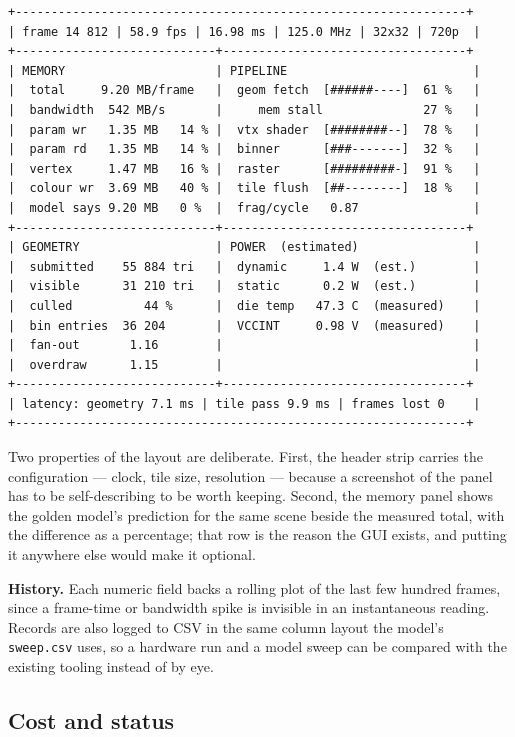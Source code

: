 \documentclass[11pt,a4paper]{article}
\newcommand{\field}[1]{\textbf{#1}\quad}
\begin{document}
\begin{verbatim}
+---------------------------------------------------------------+
| frame 14 812 | 58.9 fps | 16.98 ms | 125.0 MHz | 32x32 | 720p  |
+----------------------------+----------------------------------+
| MEMORY                     | PIPELINE                          |
|  total     9.20 MB/frame   |  geom fetch  [######----]  61 %   |
|  bandwidth  542 MB/s       |     mem stall              27 %   |
|  param wr   1.35 MB   14 % |  vtx shader  [########--]  78 %   |
|  param rd   1.35 MB   14 % |  binner      [###-------]  32 %   |
|  vertex     1.47 MB   16 % |  raster      [#########-]  91 %   |
|  colour wr  3.69 MB   40 % |  tile flush  [##--------]  18 %   |
|  model says 9.20 MB   0 %  |  frag/cycle   0.87                |
+----------------------------+----------------------------------+
| GEOMETRY                   | POWER  (estimated)                |
|  submitted    55 884 tri   |  dynamic     1.4 W  (est.)        |
|  visible      31 210 tri   |  static      0.2 W  (est.)        |
|  culled          44 %      |  die temp   47.3 C  (measured)    |
|  bin entries  36 204       |  VCCINT     0.98 V  (measured)    |
|  fan-out       1.16        |                                   |
|  overdraw      1.15        |                                   |
+----------------------------+----------------------------------+
| latency: geometry 7.1 ms | tile pass 9.9 ms | frames lost 0    |
+---------------------------------------------------------------+
\end{verbatim}

Two properties of the layout are deliberate. First, the header strip carries the
configuration --- clock, tile size, resolution --- because a screenshot of the
panel has to be self-describing to be worth keeping. Second, the memory panel
shows the golden model's prediction for the same scene beside the measured
total, with the difference as a percentage; that row is the reason the GUI
exists, and putting it anywhere else would make it optional.

\field{History.} Each numeric field backs a rolling plot of the last few hundred
frames, since a frame-time or bandwidth spike is invisible in an instantaneous
reading. Records are also logged to CSV in the same column layout the model's
\texttt{sweep.csv} uses, so a hardware run and a model sweep can be compared
with the existing tooling instead of by eye.

\subsection{Cost and status}
\end{document}

